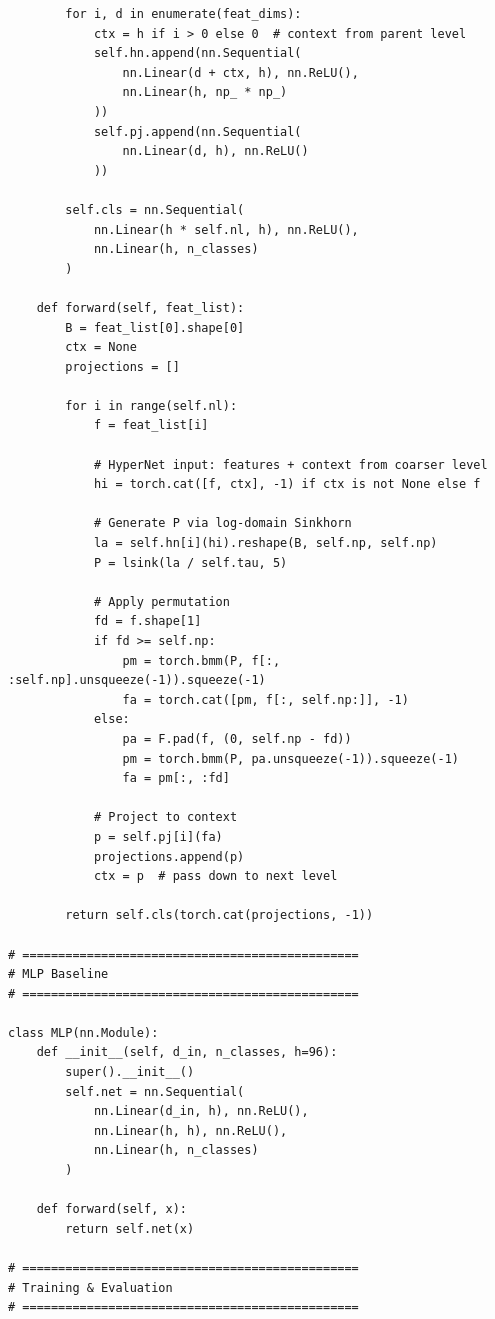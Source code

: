 \documentclass[11pt,a4paper]{report}
\begin{document}
\begin{small}
\begin{verbatim}
        for i, d in enumerate(feat_dims):
            ctx = h if i > 0 else 0  # context from parent level
            self.hn.append(nn.Sequential(
                nn.Linear(d + ctx, h), nn.ReLU(),
                nn.Linear(h, np_ * np_)
            ))
            self.pj.append(nn.Sequential(
                nn.Linear(d, h), nn.ReLU()
            ))

        self.cls = nn.Sequential(
            nn.Linear(h * self.nl, h), nn.ReLU(),
            nn.Linear(h, n_classes)
        )

    def forward(self, feat_list):
        B = feat_list[0].shape[0]
        ctx = None
        projections = []

        for i in range(self.nl):
            f = feat_list[i]

            # HyperNet input: features + context from coarser level
            hi = torch.cat([f, ctx], -1) if ctx is not None else f

            # Generate P via log-domain Sinkhorn
            la = self.hn[i](hi).reshape(B, self.np, self.np)
            P = lsink(la / self.tau, 5)

            # Apply permutation
            fd = f.shape[1]
            if fd >= self.np:
                pm = torch.bmm(P, f[:, :self.np].unsqueeze(-1)).squeeze(-1)
                fa = torch.cat([pm, f[:, self.np:]], -1)
            else:
                pa = F.pad(f, (0, self.np - fd))
                pm = torch.bmm(P, pa.unsqueeze(-1)).squeeze(-1)
                fa = pm[:, :fd]

            # Project to context
            p = self.pj[i](fa)
            projections.append(p)
            ctx = p  # pass down to next level

        return self.cls(torch.cat(projections, -1))

# ===============================================
# MLP Baseline
# ===============================================

class MLP(nn.Module):
    def __init__(self, d_in, n_classes, h=96):
        super().__init__()
        self.net = nn.Sequential(
            nn.Linear(d_in, h), nn.ReLU(),
            nn.Linear(h, h), nn.ReLU(),
            nn.Linear(h, n_classes)
        )

    def forward(self, x):
        return self.net(x)

# ===============================================
# Training & Evaluation
# ===============================================


\end{verbatim}
\end{small}
\end{document}
